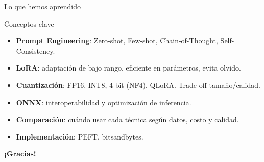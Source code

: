 \documentclass[aspectratio=169, 10pt, xcolor=table]{beamer}
\begin{document}
\begin{frame}{Lo que hemos aprendido}
    \begin{exampleblock}{Conceptos clave}
        \begin{itemize}
            \item \textbf{Prompt Engineering}: Zero-shot, Few-shot, Chain-of-Thought, Self-Consistency.
            \item \textbf{LoRA}: adaptación de bajo rango, eficiente en parámetros, evita olvido.
            \item \textbf{Cuantización}: FP16, INT8, 4-bit (NF4), QLoRA. Trade-off tamaño/calidad.
            \item \textbf{ONNX}: interoperabilidad y optimización de inferencia.
            \item \textbf{Comparación}: cuándo usar cada técnica según datos, costo y calidad.
            \item \textbf{Implementación}: PEFT, bitsandbytes.
        \end{itemize}
    \end{exampleblock}
\end{frame}

\begin{frame}
    \centering
    \Huge \textbf{¡Gracias!}

\end{frame}
\end{document}
